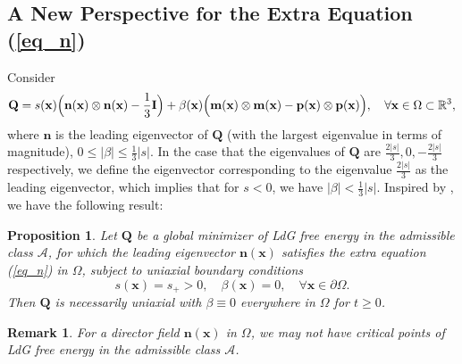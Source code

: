 \documentclass[10pt, a4paper]{article}
\newtheorem{proposition}{Proposition}[section]
\newtheorem*{rem}{Remark}
\newcommand\n{\mathbf{n}}
\newcommand\m{\mathbf{m}}
\newcommand\p{\mathbf{p}}
\newcommand\x{\mathbf{x}}
\newcommand\Qvec{\mathbf{Q}}
\newcommand\pp{\partial}
\begin{document}


\subsection{A New Perspective for the Extra Equation (\ref{eq_n})}
\label{sec:extra_equation}
Consider
\begin{equation}\label{uni_sn}
\Qvec = s(\x) \Bigl( \n(\x) \otimes \n(\x) - \frac{1}{3} \mathbf{I} \Bigr) + \beta(\x) \Bigl( \m (\x) \otimes \m (\x) - \p (\x) \otimes \p(\x) \Bigr), \quad \forall \x \in \Omega \subset  \mathbb{R}^3, 
\end{equation}
where $\n$ is the leading eigenvector of $\Qvec$ (with the largest eigenvalue in terms of magnitude), $0 \leq |\beta| \leq \frac{1}{3} |s|$. In the case that the eigenvalues of $\Qvec$ are $\frac{2|s|}{3}, 0, -\frac{2|s|}{3}$ respectively, we define the eigenvector
corresponding to the eigenvalue $\frac{2|s|}{3}$ as the leading eigenvector, which implies that for $s < 0$, we have $|\beta| < \frac{1}{3} |s|$.
Inspired by \cite{Biscari2006}, we have the following result:
\begin{proposition}
Let $\Qvec$ %
be a global minimizer of LdG free energy in the admissible class $\mathcal{A}$, for which the leading eigenvector $\n(\x)$ satisfies the extra equation (\ref{eq_n}) in $\Omega$,
subject to uniaxial boundary conditions %
\begin{equation}
s(\x) = s_{+} > 0, \quad \beta(\x) = 0, \quad \forall \x \in \pp \Omega.
\end{equation}
Then $\Qvec$ is necessarily uniaxial with $\beta \equiv 0$ everywhere in $\Omega$ for $t \geq 0$.
\end{proposition}
\begin{rem}
For a director field $\n(\x)$ in $\Omega$, we may not have critical points of LdG free energy in the admissible class $\mathcal{A}$.
\end{rem}
\end{document}

